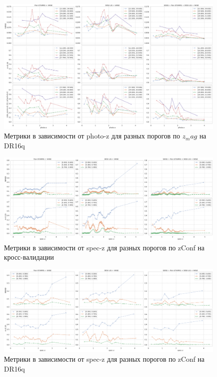 \documentclass[fleqn,usenatbib]{mnras}
\begin{document}
\begin{landscape}
\begin{figure}
    \centering
    \includegraphics[width=0.9\linewidth]{images/metrics-adv-photoz-x-zmag-dr16q.png}
    \caption{Метрики в зависимости от photo-z для разных порогов по $z_mag$ на DR16q}
    \label{fig:my_label}
\end{figure}
\end{landscape}


\begin{landscape}
\begin{figure}
    \centering
    \includegraphics[width=0.9\linewidth]{images/metrics-adv-zspec-x-zconf-cv2.png}
    \caption{Метрики в зависимости от spec-z для разных порогов по zConf на кросс-валидации}
    \label{fig:my_label}
\end{figure}
\end{landscape}


\begin{landscape}
\begin{figure}
    \centering
    \includegraphics[width=0.9\linewidth]{images/metrics-adv-zspec-x-zconf-dr16q.png}
    \caption{Метрики в зависимости от spec-z для разных порогов по zConf на DR16q}
    \label{fig:my_label}
\end{figure}
\end{landscape}
\end{document}
